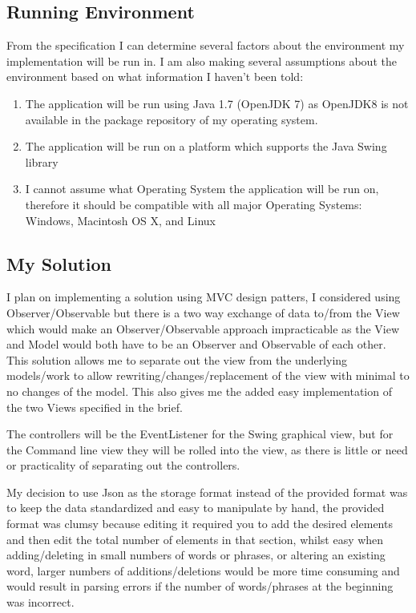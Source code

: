 \documentclass[a4paper, 11pt]{article}
\begin{document}
\subsection{Running Environment}

From the specification I can determine several factors about the environment my implementation will be run in. I am also making several assumptions about the environment based on what information I haven't been told:

\begin{enumerate}
\item The application will be run using Java 1.7 (OpenJDK 7) as OpenJDK8 is not available in the package repository of my operating system. 
\item The application will be run on a platform which supports the Java Swing library
\item I cannot assume what Operating System the application will be run on, therefore it should be compatible with all major Operating Systems: Windows, Macintosh OS X, and Linux
\end{enumerate}

\subsection{My Solution}

I plan on implementing a solution using MVC design patters, I considered using Observer/Observable but there is a two way exchange of data to/from the View which would make an Observer/Observable approach impracticable as the View and Model would both have to be an Observer and Observable of each other. This solution allows me to separate out the view from the underlying models/work to allow rewriting/changes/replacement of the view with minimal to no changes of the model. This also gives me the added easy implementation of the two Views specified in the brief. 

The controllers will be the EventListener for the Swing graphical view, but for the Command line view they will be rolled into the view, as there is little or need or practicality of separating out the controllers. 

My decision to use Json as the storage format instead of the provided format was to keep the data standardized and easy to manipulate by hand, the provided format was clumsy because editing it required you to add the desired elements and then edit the total number of elements in that section, whilst easy when adding/deleting in small numbers of words or phrases, or altering an existing word, larger numbers of additions/deletions would be more time consuming and would result in parsing errors if the number of words/phrases at the beginning was incorrect. 
\end{document}
